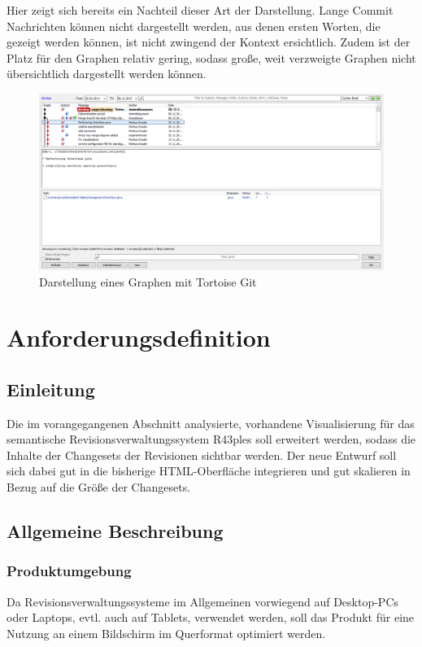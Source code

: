 \documentclass[nocolor]{tudbook}
\begin{document}
Hier zeigt sich bereits ein Nachteil dieser Art der Darstellung. Lange Commit Nachrichten können nicht dargestellt werden, aus denen ersten Worten, die gezeigt werden können, ist nicht zwingend der Kontext ersichtlich. Zudem ist der Platz für den Graphen relativ gering, sodass große, weit verzweigte Graphen nicht übersichtlich dargestellt werden können.

\begin{figure}[htb]
	\centering
	\includegraphics[width=\textwidth]{TortoiseGit.png}
	\caption{Darstellung eines Graphen mit Tortoise Git}
	\label{fig:TortoiseGit}
\end{figure}

\chapter{Anforderungsdefinition}
\section{Einleitung}
Die im vorangegangenen Abschnitt analysierte, vorhandene Visualisierung für das semantische Revisionsverwaltungssystem R43ples soll erweitert werden, sodass die Inhalte der Changesets der Revisionen sichtbar werden. Der neue Entwurf soll sich dabei gut in die bisherige HTML-Oberfläche integrieren und gut skalieren in Bezug auf die Größe der Changesets.

\section{Allgemeine Beschreibung}
\subsection{Produktumgebung}
Da Revisionsverwaltungssysteme im Allgemeinen vorwiegend auf Desktop-PCs oder Laptops, evtl. auch auf Tablets, verwendet werden, soll das Produkt für eine Nutzung an einem Bildschirm im Querformat optimiert werden.
\end{document}
